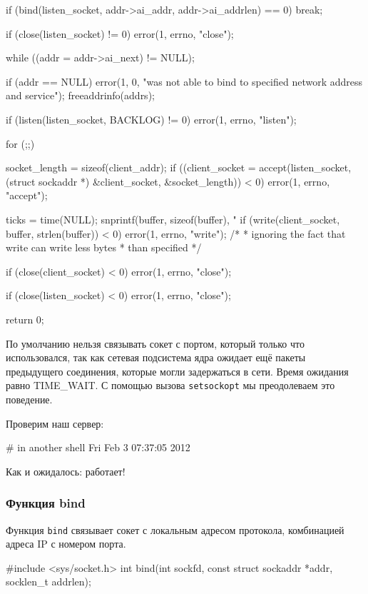 \begin{clst}{}{}
{{        if (bind(listen_socket, addr->ai_addr, addr->ai_addrlen) == 0)
            break;

        if (close(listen_socket) != 0)
            error(1, errno, "close");
    } while ((addr = addr->ai_next) != NULL);

    if (addr == NULL)
        error(1, 0, "was not able to bind to specified network address and service");
    freeaddrinfo(addrs);

    if (listen(listen_socket, BACKLOG) != 0)
        error(1, errno, "listen");

    for (;;) {
        socket_length = sizeof(client_addr);
        if ((client_socket = accept(listen_socket,
                                    (struct sockaddr *) &client_socket,
                                    &socket_length)) < 0)
            error(1, errno, "accept");

        ticks = time(NULL);
        snprintf(buffer, sizeof(buffer), "%
        if (write(client_socket, buffer, strlen(buffer)) < 0)
            error(1, errno, "write");
        /*
         *   ignoring the fact that write can write less bytes
         *   than specified
         */

        if (close(client_socket) < 0)
            error(1, errno, "close");
    }

    if (close(listen_socket) < 0)
        error(1, errno, "close");

    return 0;
}
\end{clst}

По умолчанию нельзя связывать сокет с портом, который только что использовался, так как сетевая подсистема ядра ожидает ещё пакеты предыдущего соединения, которые могли задержаться в сети. Время ожидания равно TIME\_WAIT. С помощью вызова \lstinline{setsockopt} мы преодолеваем это поведение.

Проверим наш сервер:
\begin{plainlst}{}{}
# in another shell
Fri Feb  3 07:37:05 2012
\end{plainlst}

Как и ожидалось: работает!

\subsubsection{Функция bind}
Функция \lstinline{bind} связывает сокет с локальным адресом протокола, комбинацией адреса IP с номером порта.
\begin{clst}{}{}
#include <sys/socket.h>
int bind(int sockfd, const struct sockaddr *addr, socklen_t addrlen);
\end{clst}

